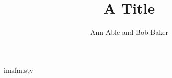 \begin{filecontents*}[overwrite]{imsfm.sty}
\newbox\fm@box
\def\open@fm{\global\setbox\fm@box=\vbox\bgroup\hsize=\textwidth}
\def\close@fm{\par\egroup\unvbox\fm@box}
\newenvironment{frontmatter}{\open@fm\ignorespaces}{\close@fm}
\def\smart@par{\ifhmode\par\fi}
\newenvironment{aug}{}{\smart@par}
\def\affiliation#1{\smart@par\vskip6\p@\bgroup\footnotesize\itshape #1\par\egroup}
\end{filecontents*}
\documentclass{article}
\usepackage{imsfm}

\begin{frontmatter}
\title{A Title}
\begin{aug}\author{Ann Able and Bob Baker}\end{aug}
\end{frontmatter}
Body.

